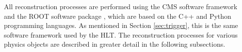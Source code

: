All reconstruction processes are performed using the CMS software framework 
and the ROOT software package \cite{root-1,root-2,root-3},
which are based on the C++ and Python programming languages.
As mentioned in Section \ref{sec:trigger}, this is the same software framework
used by the HLT.
The reconstruction processes for various physics
objects are described in greater detail in the following subsections.
